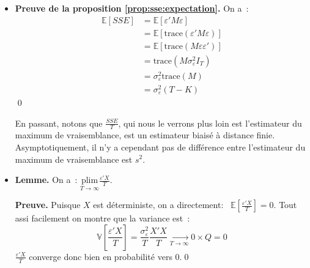 \documentclass[10pt]{beamer}
\theoremstyle{plain}
\begin{document}
\begin{notes}
  \begin{itemize}

  \item \textbf{Preuve de la proposition \ref{prop:sse:expectation}.} On a~:
    \[
      \begin{split}
        \mathbb E[SSE] &= \mathbb E [\varepsilon' M \varepsilon]\\
                       &= \mathbb E \left[\mathrm{trace}\left( \varepsilon' M \varepsilon \right)\right]\\
                       &= \mathbb E \left[\mathrm{trace}\left( M \varepsilon\varepsilon'  \right)\right]\\
                       &= \mathrm{trace}\left( M \sigma_{\varepsilon}^2 I_T  \right)\\
                       &= \sigma_{\varepsilon}^2\mathrm{trace}\left( M\right)\\
                       &= \sigma_{\varepsilon}^2(T-K)
      \end{split}
    \]
\qed

\medskip

En passant, notons que $\frac{SSE}{T}$, qui nous le verrons plus loin est l'estimateur du maximum de vraisemblance, est un estimateur biaisé à distance finie. Asymptotiquement, il n'y a cependant pas de différence entre l'estimateur du maximum de vraisemblance est $s^2$.\newline

\medskip
\item \textbf{Lemme.} On a~: $\underset{T\to\infty}{\mathrm{plim}} \frac{\varepsilon'X}{T}$.\newline\newline

  \textbf{Preuve.} Puisque $X$ est déterministe, on a directement:~ $\mathbb E \left[ \frac{\varepsilon'X}{T} \right] = 0$. Tout assi facilement on montre que la variance est~:
  \[
    \mathbb V \left[ \frac{\varepsilon'X}{T} \right] = \frac{\sigma_{\varepsilon}^2}{T}\frac{X'X}{T}\underset{T\to\infty}{\longrightarrow} 0 \times Q=0
  \]
$\frac{\varepsilon 'X}{T}$ converge donc bien en probabilité vers 0.\qed

\pagebreak


\end{itemize}
\end{notes}
\end{document}

